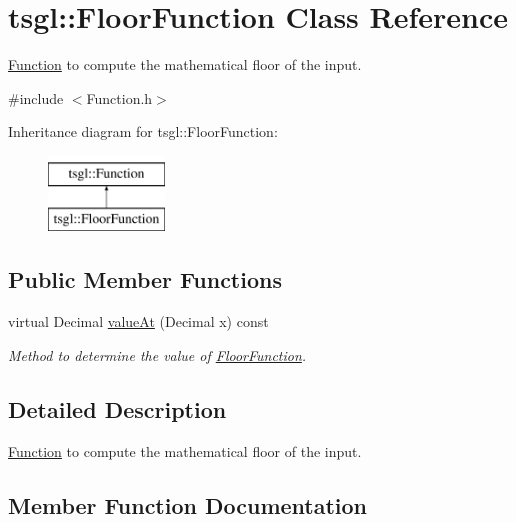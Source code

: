 \hypertarget{classtsgl_1_1_floor_function}{}\section{tsgl\+:\+:Floor\+Function Class Reference}
\label{classtsgl_1_1_floor_function}


\hyperlink{classtsgl_1_1_function}{Function} to compute the mathematical floor of the input.  




{\ttfamily \#include $<$Function.\+h$>$}

Inheritance diagram for tsgl\+:\+:Floor\+Function\+:\begin{figure}[H]
\begin{center}
\leavevmode
\includegraphics[height=2.000000cm]{classtsgl_1_1_floor_function}
\end{center}
\end{figure}
\subsection*{Public Member Functions}
\begin{DoxyCompactItemize}
\item 
virtual Decimal \hyperlink{classtsgl_1_1_floor_function_a73eedb6a65c55e070541b08c49d9f170}{value\+At} (Decimal x) const 
\begin{DoxyCompactList}\small\item\em Method to determine the value of \hyperlink{classtsgl_1_1_floor_function}{Floor\+Function}. \end{DoxyCompactList}\end{DoxyCompactItemize}


\subsection{Detailed Description}
\hyperlink{classtsgl_1_1_function}{Function} to compute the mathematical floor of the input. 

\subsection{Member Function Documentation}
\hypertarget{classtsgl_1_1_floor_function_a73eedb6a65c55e070541b08c49d9f170}{}
